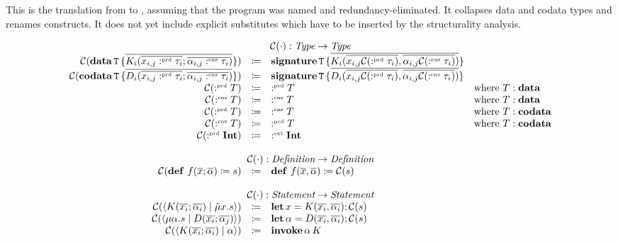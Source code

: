 This is the translation from \targetlang{} to \machinelang, assuming that the program was named and redundancy-eliminated.
It collapses data and codata types and renames constructs.
It does not yet include explicit substitutes which have to be inserted by the structurality analysis.

\[
  \begin{array}{rcll}
    \multicolumn{4}{c}{\collapse{\cdot} : \emph{Type} \rightarrow \emph{Type}}\\
    \collapse{\data{T}{\overline{K_i(\overline{x_{i,j} \prd \tau_i}; \overline{\alpha_{i,j} \cnt \tau_i})}}} & \coloneq & \sig{T}{\overline{K_i(\overline{x_{i,j} \collapse{\prd \tau_i}}, \overline{\alpha_{i,j} \collapse{\cnt \tau_i}})}} & \\
    \collapse{\codata{T}{\overline{D_i(\overline{x_{i,j} \prd \tau_i}; \overline{\alpha_{i,j} \cnt \tau_i})}}} & \coloneq & \sig{T}{\overline{D_i(\overline{x_{i,j} \collapse{\prd \tau_i}}, \overline{\alpha_{i,j} \collapse{\cnt \tau_i}})}} & \\
    \collapse{\prd T} & \coloneq & \prd T & \text{where } T : \mathbf{data} \\
    \collapse{\cnt T} & \coloneq & \cnt T & \text{where } T : \mathbf{data} \\
    \collapse{\prd T} & \coloneq & \cnt T & \text{where } T : \mathbf{codata} \\
    \collapse{\cnt T} & \coloneq & \prd T & \text{where } T : \mathbf{codata} \\
    \collapse{\prd \tyint} & \coloneq & \ext \tyint & \\
    \\
    \multicolumn{4}{c}{\collapse{\cdot} : \emph{Definition} \rightarrow \emph{Definition}}\\
    \collapse{\defi{f(\overline{x}; \overline{\alpha})}{s}} & \coloneq & \defi{f(\overline{x}, \overline{\alpha})}{\collapse{s}} & \\
    \\
    \multicolumn{4}{c}{\collapse{\cdot} : \emph{Statement} \rightarrow \emph{Statement}}\\
    \collapse{\cut{K(\overline{x_i}; \overline{\alpha_i})}{\tilde{\mu}x.s}} & \coloneq & \letac{x}{K(\overline{x_i}, \overline{\alpha_i})}{\collapse{s}} & \\
    \collapse{\cut{\mu\alpha.s}{D(\overline{x_i}; \overline{\alpha_j})}} & \coloneq & \letac{\alpha}{D(\overline{x_i}, \overline{\alpha_i})}{\collapse{s}} & \\
    \collapse{\cut{K(\overline{x_i}; \overline{\alpha_i})}{\alpha}} & \coloneq & \invoke{\alpha}{K} & \\

\end{array}\]
